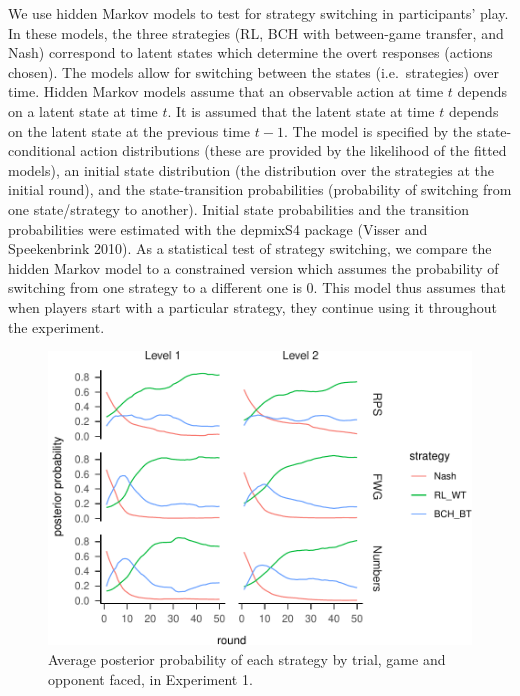 \documentclass[smallextended]{svjour3}       %
\begin{document}
We use hidden Markov models to test for strategy switching in
participants' play. In these models, the three strategies (RL, BCH with
between-game transfer, and Nash) correspond to latent states which
determine the overt responses (actions chosen). The models allow for
switching between the states (i.e.~strategies) over time. Hidden Markov
models assume that an observable action at time \(t\) depends on a
latent state at time \(t\). It is assumed that the latent state at time
\(t\) depends on the latent state at the previous time \(t-1\). The
model is specified by the state-conditional action distributions (these
are provided by the likelihood of the fitted models), an initial state
distribution (the distribution over the strategies at the initial
round), and the state-transition probabilities (probability of switching
from one state/strategy to another). Initial state probabilities and the
transition probabilities were estimated with the depmixS4 package
(Visser and Speekenbrink 2010). As a statistical test of strategy
switching, we compare the hidden Markov model to a constrained version
which assumes the probability of switching from one strategy to a
different one is 0. This model thus assumes that when players start with
a particular strategy, they continue using it throughout the experiment.

\begin{figure}

{\centering \includegraphics[width=\textwidth]{CBB_v2_files/figure-latex/exp1-posteriors-plot-1} 

}

\caption{Average posterior probability of each strategy by trial, game and opponent faced, in Experiment 1.}\label{fig:exp1-posteriors-plot}
\end{figure}
\end{document}
